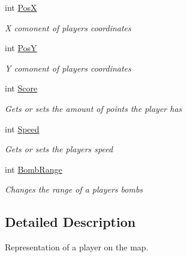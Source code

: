 \begin{DoxyCompactItemize}
int \mbox{\hyperlink{class_bomberman_1_1_model_1_1_player_a6e24240f914d0b879557a93eb2f03479}{PosX}}
\begin{DoxyCompactList}\small\item\em X comonent of player\textquotesingle{}s coordinates \end{DoxyCompactList}\item 
int \mbox{\hyperlink{class_bomberman_1_1_model_1_1_player_ad5e6234ab27cbfa407643132a77b1651}{PosY}}
\begin{DoxyCompactList}\small\item\em Y comonent of player\textquotesingle{}s coordinates \end{DoxyCompactList}\item 
int \mbox{\hyperlink{class_bomberman_1_1_model_1_1_player_a82d136aad5ff0fb6709a8a41cde5e7fc}{Score}}
\begin{DoxyCompactList}\small\item\em Gets or sets the amount of points the player has \end{DoxyCompactList}\item 
int \mbox{\hyperlink{class_bomberman_1_1_model_1_1_player_a72a4cfd9b2ad1321d2945a056940df5c}{Speed}}
\begin{DoxyCompactList}\small\item\em Gets or sets the player\textquotesingle{}s speed \end{DoxyCompactList}\item 
int \mbox{\hyperlink{class_bomberman_1_1_model_1_1_player_a3864e188645cc25176aef083c934bbe7}{Bomb\+Range}}
\begin{DoxyCompactList}\small\item\em Changes the range of a player\textquotesingle{}s bombs \end{DoxyCompactList}\end{DoxyCompactItemize}


\subsection{Detailed Description}
Representation of a player on the map. 



